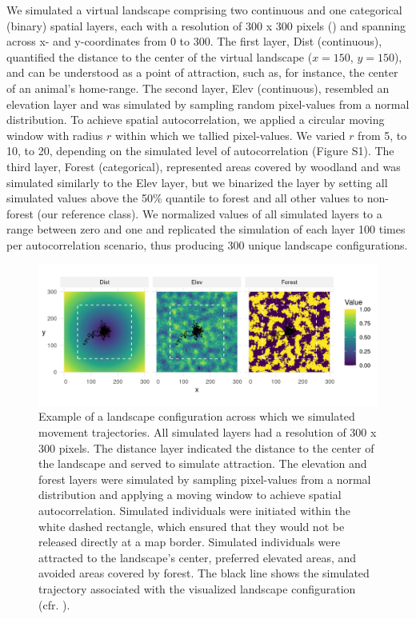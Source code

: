 \documentclass[abstract=on,10pt,a4paper,bibliography=totocnumbered]{article}
\begin{document}
We simulated a virtual landscape comprising two continuous and one categorical
(binary) spatial layers, each with a resolution of 300 x 300 pixels
() and spanning across x- and y-coordinates from 0 to 300. The
first layer, \textsf{Dist} (continuous), quantified the distance to the center
of the virtual landscape ($x = 150$, $y = 150$), and can be understood as a
point of attraction, such as, for instance, the center of an animal's
home-range. The second layer, \textsf{Elev} (continuous), resembled an elevation
layer and was simulated by sampling random pixel-values from a normal
distribution. To achieve spatial autocorrelation, we applied a circular moving
window with radius $r$ within which we tallied pixel-values. We varied $r$ from
5, to 10, to 20, depending on the simulated level of autocorrelation (Figure
S1). The third layer, \textsf{Forest} (categorical), represented areas covered
by woodland and was simulated similarly to the \textsf{Elev} layer, but we
binarized the layer by setting all simulated values above the 50\% quantile to
forest and all other values to non-forest (our reference class). We normalized
values of all simulated layers to a range between zero and one and replicated
the simulation of each layer 100 times per autocorrelation scenario, thus
producing 300 unique landscape configurations.

\begin{figure}
  \begin{center}
  \includegraphics[width = \textwidth]{99_Covariates.png}
  \caption{Example of a landscape configuration across which we simulated
  movement trajectories. All simulated layers had a resolution of 300 x 300
  pixels. The distance layer indicated the distance to the center of the
  landscape and served to simulate attraction. The elevation and forest layers
  were simulated by sampling pixel-values from a normal distribution and
  applying a moving window to achieve spatial autocorrelation. Simulated
  individuals were initiated within the white dashed rectangle, which ensured
  that they would not be released directly at a map border. Simulated
  individuals were attracted to the landscape's center, preferred elevated
  areas, and avoided areas covered by forest. The black line shows the simulated
  trajectory associated with the visualized landscape configuration (cfr.
  ).}
  \label{Covariates}
  \end{center}
\end{figure}
\end{document}
